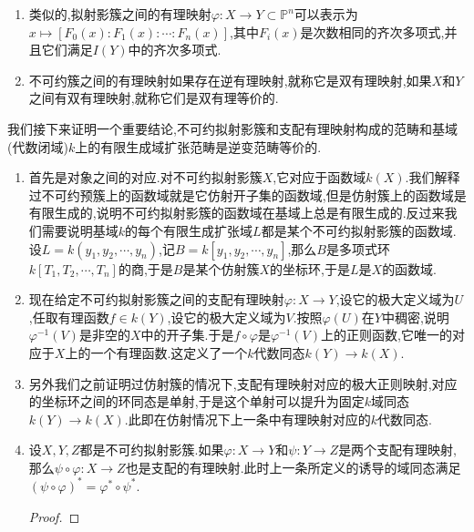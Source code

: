 \begin{enumerate}
\begin{proof}
    	假设$\varphi^*(f)=0$,此即$f(\varphi(x))=0,\forall x\in U$.按照$\varphi$的像集是$Y$的稠密集,说明$f$的零点集包含一个稠密集,但是$f$是连续的,这迫使$f$处处为零.
    \end{proof}
    \item 类似的,拟射影簇之间的有理映射$\varphi:X\to Y\subset\mathbb{P}^n$可以表示为$x\mapsto[F_0(x):F_1(x):\cdots:F_n(x)]$,其中$F_i(x)$是次数相同的齐次多项式,并且它们满足$I(Y)$中的齐次多项式.
    \item 不可约簇之间的有理映射如果存在逆有理映射,就称它是双有理映射,如果$X$和$Y$之间有双有理映射,就称它们是双有理等价的.
\end{enumerate}

我们接下来证明一个重要结论,不可约拟射影簇和支配有理映射构成的范畴和基域(代数闭域)$k$上的有限生成域扩张范畴是逆变范畴等价的.
\begin{enumerate}
	\item 首先是对象之间的对应.对不可约拟射影簇$X$,它对应于函数域$k(X)$.我们解释过不可约预簇上的函数域就是它仿射开子集的函数域,但是仿射簇上的函数域是有限生成的,说明不可约拟射影簇的函数域在基域上总是有限生成的.反过来我们需要说明基域$k$的每个有限生成扩张域$L$都是某个不可约拟射影簇的函数域.设$L=k(y_1,y_2,\cdots,y_n)$,记$B=k[y_1,y_2,\cdots,y_n]$,那么$B$是多项式环$k[T_1,T_2,\cdots,T_n]$的商,于是$B$是某个仿射簇$X$的坐标环,于是$L$是$X$的函数域.
	\item 现在给定不可约拟射影簇之间的支配有理映射$\varphi:X\to Y$,设它的极大定义域为$U$,任取有理函数$f\in k(Y)$,设它的极大定义域为$V$.按照$\varphi(U)$在$Y$中稠密,说明$\varphi^{-1}(V)$是非空的$X$中的开子集.于是$f\circ\varphi$是$\varphi^{-1}(V)$上的正则函数,它唯一的对应于$X$上的一个有理函数.这定义了一个$k$代数同态$k(Y)\to k(X)$.
	\item 另外我们之前证明过仿射簇的情况下,支配有理映射对应的极大正则映射,对应的坐标环之间的环同态是单射,于是这个单射可以提升为固定$k$域同态$k(Y)\to k(X)$.此即在仿射情况下上一条中有理映射对应的$k$代数同态.
	\item 设$X,Y,Z$都是不可约拟射影簇.如果$\varphi:X\to Y$和$\psi:Y\to Z$是两个支配有理映射,那么$\psi\circ\varphi:X\to Z$也是支配的有理映射.此时上一条所定义的诱导的域同态满足$(\psi\circ\varphi)^*=\varphi^*\circ\psi^*$.
	\begin{proof}
		

\end{proof}
\end{enumerate}

